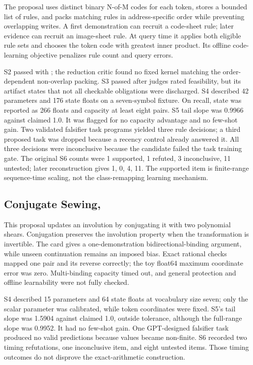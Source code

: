 The proposal uses distinct binary N-of-M codes for each token, stores a bounded list of rules, and packs matching rules in address-specific order while preventing overlapping writes. A first demonstration can recruit a code-sheet rule; later evidence can recruit an image-sheet rule. At query time it applies both eligible rule sets and chooses the token code with greatest inner product. Its offline code-learning objective penalizes rule count and query errors.

S2 passed with ; the reduction critic found no fixed kernel matching the order-dependent non-overlap packing. S3 passed after judges rated feasibility, but its artifact states that not all checkable obligations were discharged. S4 described 42 parameters and 176 state floats on a seven-symbol fixture. On recall, state was reported as 266 floats and capacity at least eight pairs. S5 tail slope was 0.9966 against claimed 1.0. It was flagged for no capacity advantage and no few-shot gain. Two validated falsifier task programs yielded three rule decisions; a third proposed task was dropped because a recency control already answered it. All three decisions were inconclusive because the candidate failed the task training gate. The original S6 counts were 1 supported, 1 refuted, 3 inconclusive, 11 untested; later reconstruction gives 1, 0, 4, 11. The supported item is finite-range sequence-time scaling, not the class-remapping learning mechanism.

\subsection{Conjugate Sewing, }

This proposal updates an involution by conjugating it with two polynomial shears. Conjugation preserves the involution property when the transformation is invertible. The card gives a one-demonstration bidirectional-binding argument, while unseen continuation remains an imposed bias. Exact rational checks mapped one pair and its reverse correctly; the toy float64 maximum coordinate error was zero. Multi-binding capacity timed out, and general protection and offline learnability were not fully checked.

S4 described 15 parameters and 64 state floats at vocabulary size seven; only the scalar parameter was calibrated, while token coordinates were fixed. S5's tail slope was 1.5904 against claimed 1.0, outside tolerance, although the full-range slope was 0.9952. It had no few-shot gain. One GPT-designed falsifier task produced no valid predictions because values became non-finite. S6 recorded two timing refutations, one inconclusive item, and eight untested items. Those timing outcomes do not disprove the exact-arithmetic construction.

